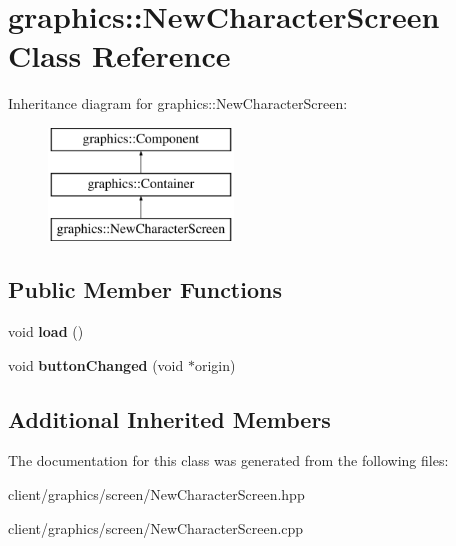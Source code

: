 \hypertarget{classgraphics_1_1_new_character_screen}{\section{graphics\-:\-:New\-Character\-Screen Class Reference}
\label{classgraphics_1_1_new_character_screen}
}
Inheritance diagram for graphics\-:\-:New\-Character\-Screen\-:\begin{figure}[H]
\begin{center}
\leavevmode
\includegraphics[height=3.000000cm]{classgraphics_1_1_new_character_screen}
\end{center}
\end{figure}
\subsection*{Public Member Functions}
\begin{DoxyCompactItemize}
\item 
\hypertarget{classgraphics_1_1_new_character_screen_a167fcdfa4fc4be62a2eda2d2379b1169}{void {\bfseries load} ()}\label{classgraphics_1_1_new_character_screen_a167fcdfa4fc4be62a2eda2d2379b1169}

\item 
\hypertarget{classgraphics_1_1_new_character_screen_a848badf05a41a0e84df14fa39d5c6f4a}{void {\bfseries button\-Changed} (void $\ast$origin)}\label{classgraphics_1_1_new_character_screen_a848badf05a41a0e84df14fa39d5c6f4a}

\end{DoxyCompactItemize}
\subsection*{Additional Inherited Members}


The documentation for this class was generated from the following files\-:\begin{DoxyCompactItemize}
\item 
client/graphics/screen/New\-Character\-Screen.\-hpp\item 
client/graphics/screen/New\-Character\-Screen.\-cpp\end{DoxyCompactItemize}
